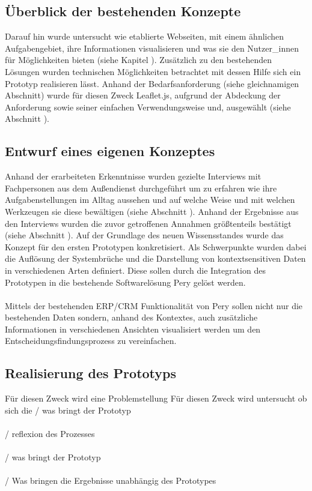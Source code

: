 \documentclass[Bachelorarbeit.tex]{subfiles}
\begin{document}
\subsection*{Überblick der bestehenden Konzepte}
Darauf hin wurde untersucht wie etablierte Webseiten, mit einem ähnlichen Aufgabengebiet, ihre Informationen visualisieren und was sie den Nutzer\_innen für Möglichkeiten bieten (siehe Kapitel ). 
Zusätzlich zu den bestehenden Lösungen wurden technischen Möglichkeiten betrachtet mit dessen Hilfe sich ein Prototyp realisieren lässt.
Anhand der Bedarfsanforderung (siehe gleichnamigen Abschnitt) wurde für diesen Zweck Leaflet.js, aufgrund der Abdeckung der Anforderung sowie seiner einfachen Verwendungsweise und, ausgewählt (siehe Abschnitt ).

\subsection*{Entwurf eines eigenen Konzeptes}
Anhand der erarbeiteten Erkenntnisse wurden gezielte Interviews mit Fachpersonen aus dem Außendienst durchgeführt um zu erfahren wie ihre Aufgabenstellungen im Alltag aussehen und auf welche Weise und mit welchen Werkzeugen sie diese bewältigen (siehe Abschnitt ). 
Anhand der Ergebnisse aus den Interviews wurden die zuvor getroffenen Annahmen größtenteils bestätigt (siehe Abschnitt ).
Auf der Grundlage des neuen Wissensstandes wurde das Konzept für den ersten Prototypen konkretisiert. 
Als Schwerpunkte wurden dabei die Auflösung der Systembrüche und die Darstellung von kontextsensitiven Daten in verschiedenen Arten definiert.
Diese sollen durch die Integration des Prototypen in die bestehende Softwarelösung Pery gelöst werden. \\
\\
Mittels der bestehenden \ac{ERP}/\ac{CRM} Funktionalität von Pery sollen nicht nur die bestehenden Daten sondern, anhand des Kontextes, auch zusätzliche Informationen in verschiedenen Ansichten visualisiert werden um den Entscheidungsfindungsprozess zu vereinfachen. 

\subsection*{Realisierung des Prototyps}

Für diesen Zweck wird eine Problemstellung 
Für diesen Zweck wird untersucht ob sich die    
/ was bringt der Prototyp\\
\\
/ reflexion des Prozesses\\
\\
/ was bringt der Prototyp\\
\\
/ Was bringen die Ergebnisse unabhängig des Prototypes\\
\end{document}
